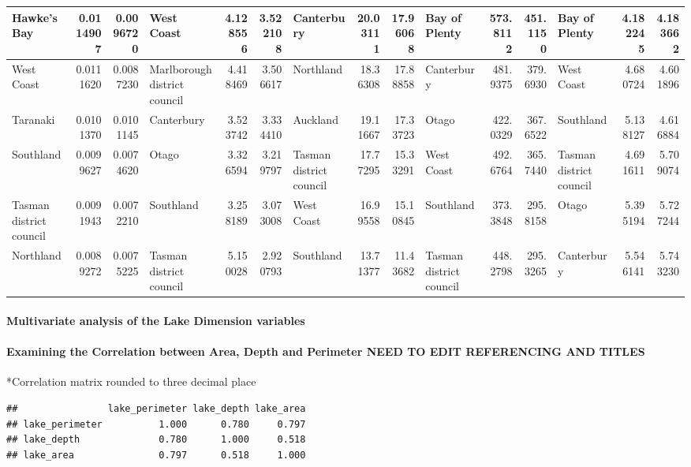 \documentclass[
]{article}
\begin{document}
\begin{table}
{\begin{tabular}[t]{l|r|r|l|r|r|l|r|r|l|r|r|l|r|r}
\hline
Hawke's Bay & 0.0114907 & 0.0096720 & West Coast & 4.128556 & 3.522108 & Canterbury & 20.03111 & 17.96068 & Bay of Plenty & 573.8112 & 451.1150 & Bay of Plenty & 4.182245 & 4.183662\\
\hline
West Coast & 0.0111620 & 0.0087230 & Marlborough district council & 4.418469 & 3.506617 & Northland & 18.36308 & 17.88858 & Canterbury & 481.9375 & 379.6930 & West Coast & 4.680724 & 4.601896\\
\hline
Taranaki & 0.0101370 & 0.0101145 & Canterbury & 3.523742 & 3.334410 & Auckland & 19.11667 & 17.33723 & Otago & 422.0329 & 367.6522 & Southland & 5.138127 & 4.616884\\
\hline
Southland & 0.0099627 & 0.0074620 & Otago & 3.326594 & 3.219797 & Tasman district council & 17.77295 & 15.33291 & West Coast & 492.6764 & 365.7440 & Tasman district council & 4.691611 & 5.709074\\
\hline
Tasman district council & 0.0091943 & 0.0072210 & Southland & 3.258189 & 3.073008 & West Coast & 16.99558 & 15.10845 & Southland & 373.3848 & 295.8158 & Otago & 5.395194 & 5.727244\\
\hline
Northland & 0.0089272 & 0.0075225 & Tasman district council & 5.150028 & 2.920793 & Southland & 13.71377 & 11.43682 & Tasman district council & 448.2798 & 295.3265 & Canterbury & 5.546141 & 5.743230\\
\hline
\end{tabular}}
\end{table}

\hypertarget{multivariate-analysis-of-the-lake-dimension-variables}{%
\paragraph{Multivariate analysis of the Lake Dimension variables}\label{multivariate-analysis-of-the-lake-dimension-variables}}

\hypertarget{examining-the-correlation-between-area-depth-and-perimeter-need-to-edit-referencing-and-titles}{%
\paragraph{Examining the Correlation between Area, Depth and Perimeter NEED TO EDIT REFERENCING AND TITLES}\label{examining-the-correlation-between-area-depth-and-perimeter-need-to-edit-referencing-and-titles}}

*Correlation matrix rounded to three decimal place

\begin{verbatim}
##                lake_perimeter lake_depth lake_area
## lake_perimeter          1.000      0.780     0.797
## lake_depth              0.780      1.000     0.518
## lake_area               0.797      0.518     1.000
\end{verbatim}
\end{document}
